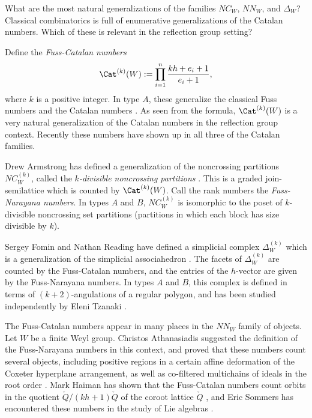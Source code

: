 \begin{problemblock}

\begin{problem}[1.4]
\label{central:three}
What are the most natural generalizations of the families $NC_W$, $NN_W$, and $\Delta_W$? Classical combinatorics is full of enumerative generalizations of the Catalan numbers. Which of these is relevant in the reflection group setting?
\end{problem}

Define the \emph{Fuss-Catalan numbers}
\begin{equation*}
\Cat^{(k)}(W):= \prod_{i=1}^n \frac{kh+e_i+1}{e_i+1},
\end{equation*}
where $k$ is a positive integer. In type $A$, these generalize the classical Fuss numbers and the Catalan numbers \cite{fomin-reading,hilton-pederson}. As seen from the formula, $\Cat^{(k)}(W)$ is a very natural generalization of the Catalan numbers in the reflection group context. Recently these numbers  have shown up in all three of the Catalan families.

\begin{remark}
Drew Armstrong has defined a generalization of the noncrossing partitions $NC_W^{(k)}$, called the \emph{$k$-divisible noncrossing partitions} \cite{armstrong}. This is a graded join-semilattice which is counted by $\Cat^{(k)}(W)$. Call the rank numbers the \emph{Fuss-Narayana numbers}. In types $A$ and $B$, $NC_W^{(k)}$ is isomorphic to the poset of $k$-divisible noncrossing set partitions (partitions in which each block has size divisible by $k$).
\end{remark}

\begin{remark}
Sergey Fomin and Nathan Reading have defined a simplicial complex $\Delta^{(k)}_W$ which is a generalization of the simplicial associahedron \cite{fomin-reading}. The facets of $\Delta^{(k)}_W$ are counted by the Fuss-Catalan numbers, and the entries of the $h$-vector are given by the Fuss-Narayana numbers. In types $A$ and $B$, this complex is defined in terms of $(k+2)$-angulations of a regular polygon, and has been studied independently by Eleni Tzanaki \cite{tzanaki}.
\end{remark}

\begin{remark}
The Fuss-Catalan numbers appear in many places in the $NN_W$ family of objects. Let $W$ be a finite Weyl group. Christos Athanasiadis suggested the definition of the Fuss-Narayana numbers in this context, and proved that these numbers count several objects, including positive regions in a certain affine deformation of the Coxeter hyperplane arrangement, as well as co-filtered multichains of ideals in the root order \cite{athanasiadis:cat,athanasiadis:nar}. Mark Haiman has shown that the Fuss-Catalan numbers count orbits in the quotient $\check{Q}/(kh+1)\check{Q}$ of the coroot lattice $\check{Q}$ \cite{haiman:conjectures}, and Eric Sommers has encountered these numbers in the study of Lie algebras \cite{sommers}.
\end{remark}
\end{problemblock}

